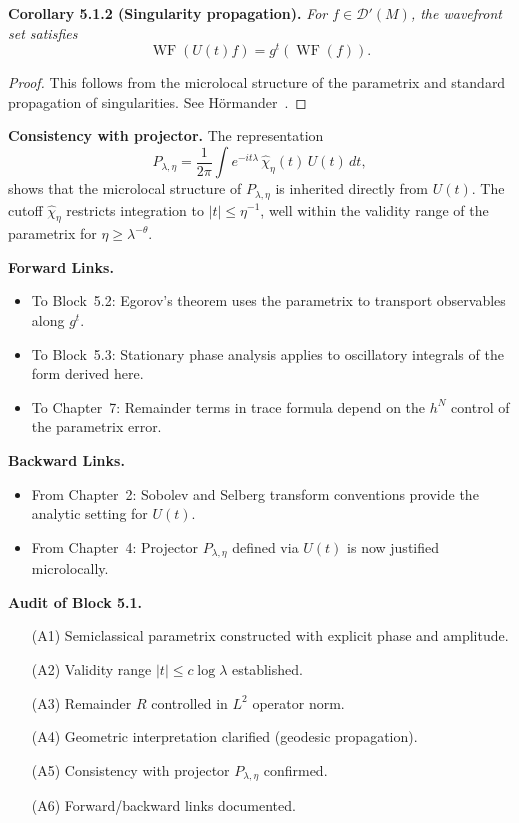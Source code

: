 \medskip

\noindent\textbf{Corollary 5.1.2 (Singularity propagation).}
\emph{For $f\in \mathcal{D}'(M)$,
the wavefront set satisfies}
\[
  \operatorname{WF}(U(t)f) = g^t(\operatorname{WF}(f)).
\]

\begin{proof}
This follows from the microlocal structure of the parametrix and standard propagation of singularities.
See Hörmander~\cite[Vol.~IV]{Hormander1994}.
\end{proof}

\medskip

\noindent\textbf{Consistency with projector.}
The representation
\[
  P_{\lambda,\eta} = \frac{1}{2\pi} \int e^{-it\lambda}\,\widehat{\chi}_\eta(t)\, U(t)\,dt,
\]
shows that the microlocal structure of $P_{\lambda,\eta}$
is inherited directly from $U(t)$.
The cutoff $\widehat{\chi}_\eta$ restricts integration to $|t|\le \eta^{-1}$,
well within the validity range of the parametrix for $\eta\ge \lambda^{-\theta}$.

\medskip

\noindent\textbf{Forward Links.}
\begin{itemize}
  \item To Block~5.2: Egorov’s theorem uses the parametrix to transport observables along $g^t$.
  \item To Block~5.3: Stationary phase analysis applies to oscillatory integrals of the form derived here.
  \item To Chapter~7: Remainder terms in trace formula depend on the $h^N$ control of the parametrix error.
\end{itemize}

\medskip

\noindent\textbf{Backward Links.}
\begin{itemize}
  \item From Chapter~2: Sobolev and Selberg transform conventions provide the analytic setting for $U(t)$.
  \item From Chapter~4: Projector $P_{\lambda,\eta}$ defined via $U(t)$ is now justified microlocally.
\end{itemize}

\medskip

\noindent\textbf{Audit of Block 5.1.}
\begin{itemize}
  \item[(A1)] Semiclassical parametrix constructed with explicit phase and amplitude.
  \item[(A2)] Validity range $|t|\le c\log \lambda$ established.
  \item[(A3)] Remainder $R$ controlled in $L^2$ operator norm.
  \item[(A4)] Geometric interpretation clarified (geodesic propagation).
  \item[(A5)] Consistency with projector $P_{\lambda,\eta}$ confirmed.
  \item[(A6)] Forward/backward links documented.
\end{itemize}

